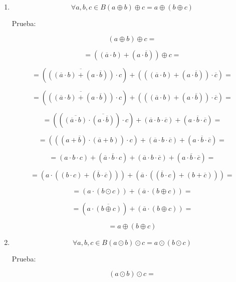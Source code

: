 \documentclass[
]{article}
\begin{document}
\begin{enumerate}
\begin{enumerate}
\begin{enumerate}
      \begin{enumerate}
      \def\labelenumiv{\arabic{enumiv}.}
      \item
        \[\forall a,b,{c \in B}{({a \oplus b})} \oplus {c = a} \oplus {({b \oplus c})}\]

        Prueba:

        \[{({a \oplus b})} \oplus {c =}\]

        \[{= {({{({\overline{a} \cdot b})} + {({a \cdot \overline{b}})}})}} \oplus {c =}\]

        \[{= {{({\overline{({{({\overline{a}\cdot b})}+{({a\cdot\overline{b}})}})} \cdot c})} + {({{({{({\overline{a} \cdot b})} + {({a \cdot \overline{b}})}})} \cdot \overline{c}})}}} =\]

        \[{= {{({\overline{({{({\overline{a}\cdot b})}+{({a\cdot\overline{b}})}})} \cdot c})} + {({{({{({\overline{a} \cdot b})} + {({a \cdot \overline{b}})}})} \cdot \overline{c}})}}} =\]

        \[{= {{{({{({\overline{({\overline{a}\cdot b})} \cdot \overline{({a\cdot\overline{b}})}})} \cdot c})} + {({{\overline{a} \cdot b} \cdot \overline{c}})}} + {({{a \cdot \overline{b}} \cdot \overline{c}})}}} =\]

        \[{= {{{({{({{({a + \overline{b}})} \cdot {({\overline{a} + b})}})} \cdot c})} + {({{\overline{a} \cdot b} \cdot \overline{c}})}} + {({{a \cdot \overline{b}} \cdot \overline{c}})}}} =\]

        \[{= {{{{({{a \cdot b} \cdot c})} + {({{\overline{a} \cdot \overline{b}} \cdot c})}} + {({{\overline{a} \cdot b} \cdot \overline{c}})}} + {({{a \cdot \overline{b}} \cdot \overline{c}})}}} =\]

        \[{= {{({a \cdot {({{({b \cdot c})} + {({\overline{b} \cdot \overline{c}})}})}})} + {({\overline{a} \cdot {({{({\overline{b} \cdot c})} + {({b + \overline{c}})}})}})}}} =\]

        \[{= {{({a \cdot {({b \odot c})}})} + {({\overline{a} \cdot {({b \oplus c})}})}}} =\]

        \[{= {{({a \cdot \overline{({b\oplus c})}})} + {({\overline{a} \cdot {({b \oplus c})}})}}} =\]

        \[{= a} \oplus {({b \oplus c})}\]
      \item
        \[\forall a,b,{c \in B}{({a \odot b})} \odot {c = a} \odot {({b \odot c})}\]

        Prueba:

        \[{({a \odot b})} \odot {c =}\]


\end{enumerate}
\end{enumerate}
\end{enumerate}
\end{enumerate}
\end{document}
